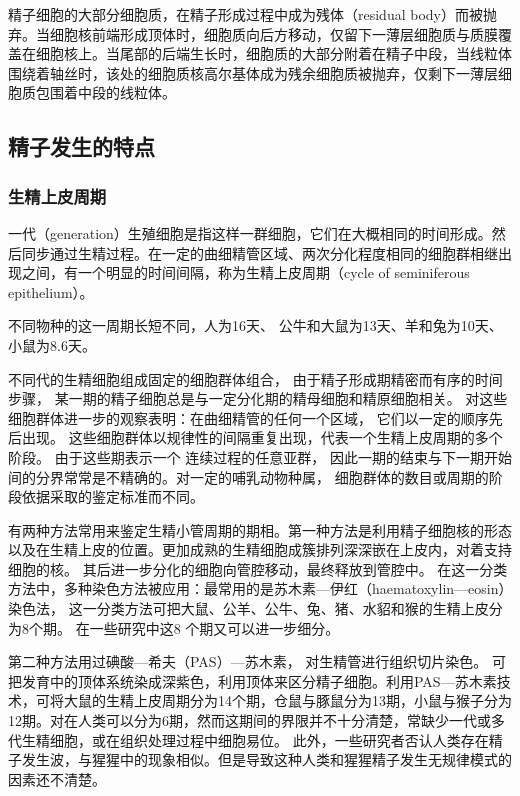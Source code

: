 精子细胞的大部分细胞质，在精子形成过程中成为残体（residual body）而被抛弃。当细胞核前端形成顶体时，细胞质向后方移动，仅留下一薄层细胞质与质膜覆盖在细胞核上。当尾部的后端生长时，细胞质的大部分附着在精子中段，当线粒体围绕着轴丝时，该处的细胞质核高尔基体成为残余细胞质被抛弃，仅剩下一薄层细胞质包围着中段的线粒体。

\subsection{精子发生的特点}

\subsubsection{生精上皮周期}

一代（generation）生殖细胞是指这样一群细胞，它们在大概相同的时间形成。然后同步通过生精过程。在一定的曲细精管区域、两次分化程度相同的细胞群相继出现之间，有一个明显的时间间隔，称为生精上皮周期（cycle of seminiferous epithelium）。

不同物种的这一周期长短不同，人为16天、 公牛和大鼠为13天、羊和兔为10天、小鼠为8.6天。

不同代的生精细胞组成固定的细胞群体组合， 由于精子形成期精密而有序的时间步骤， 某一期的精子细胞总是与一定分化期的精母细胞和精原细胞相关。 对这些细胞群体进一步的观察表明：在曲细精管的任何一个区域， 它们以一定的顺序先后出现。 这些细胞群体以规律性的间隔重复出现，代表一个生精上皮周期的多个阶段。 由于这些期表示一个
连续过程的任意亚群， 因此一期的结束与下一期开始间的分界常常是不精确的。对一定的哺乳动物种属， 细胞群体的数目或周期的阶段依据采取的鉴定标准而不同。

有两种方法常用来鉴定生精小管周期的期相。第一种方法是利用精子细胞核的形态以及在生精上皮的位置。更加成熟的生精细胞成簇排列深深嵌在上皮内，对着支持细胞的核。 其后进一步分化的细胞向管腔移动，最终释放到管腔中。 在这一分类方法中，多种染色方法被应用：最常用的是苏木素---伊红（haematoxylin---eosin）染色法， 这一分类方法可把大鼠、公羊、公牛、兔、猪、水貂和猴的生精上皮分为8个期。 在一些研究中这8 个期又可以进一步细分。

第二种方法用过碘酸---希夫（PAS）---苏木素， 对生精管进行组织切片染色。 可把发育中的顶体系统染成深紫色，利用顶体来区分精子细胞。利用PAS---苏木素技术，可将大鼠的生精上皮周期分为14个期，仓鼠与豚鼠分为13期，小鼠与猴子分为12期。对在人类可以分为6期，然而这期间的界限并不十分清楚，常缺少一代或多代生精细胞，或在组织处理过程中细胞易位。 此外，一些研究者否认人类存在精子发生波，与猩猩中的现象相似。但是导致这种人类和猩猩精子发生无规律模式的因素还不清楚。

